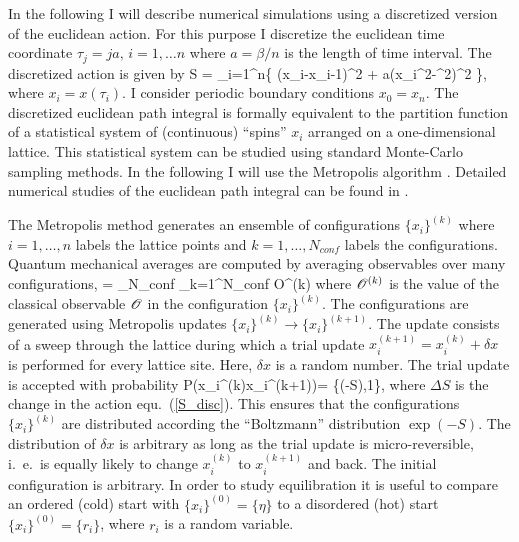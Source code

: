 In the following I will describe numerical simulations using a discretized 
version of the euclidean action. For this purpose I discretize the euclidean 
time coordinate $\tau_j=ja,\,i=1,\ldots n$ where $a=\beta/n$ is the length 
of time interval. The discretized action is given by
\be
\label{S_disc}
 S = \sum_{i=1}^{n}\left\{  (x_i-x_{i-1})^2
  + a(x_i^2-\eta^2)^2 \right\},
\ee
where $x_i=x(\tau_i)$. I consider periodic boundary conditions $x_0=x_n$. 
The discretized euclidean path integral is formally equivalent to the 
partition function of a statistical system of (continuous) ``spins'' 
$x_i$ arranged on a one-dimensional lattice. This statistical system 
can be studied using standard Monte-Carlo sampling methods. In the following 
I will use the Metropolis algorithm \cite{Metropolis:1953am}. Detailed
numerical studies of the euclidean path integral can be found in 
\cite{Creutz:1980gp,Shuryak:1984xr,Shuryak:1987tr,Schafer:2004xa}.

 The Metropolis method generates an ensemble of configurations
$\{x_i\}^{(k)}$ where $i=1,\ldots, n$ labels the lattice points and $k=
1,\ldots,N_{conf}$ labels the configurations. Quantum mechanical averages 
are computed by averaging observables over many configurations, 
\be 
{} \rangle = \lim_{N_{conf}\to\infty}
 \sum_{k=1}^{N_{conf}}
 {\cal O}^{(k)}
\ee
where ${\cal O}^{(k)}$ is the value of the classical observable
${\cal O}$ in the configuration $\{x_i\}^{(k)}$. The configurations 
are generated using Metropolis updates $\{x_i\}^{(k)}\to \{x_i\}^{(k+1)}$. 
The update consists of a sweep through the lattice during which a trial 
update $x_i^{(k+1)}= x_i^{(k)} +\delta x$ is performed for every lattice 
site. Here, $\delta x$ is a random number. The trial update is accepted 
with probability
\be
 P\left(x_i^{(k)}\to x_i^{(k+1)}\right)=
   \min\left\{\exp(-\Delta S),1\right\},
\ee 
where $\Delta S$ is the change in the action equ.~(\ref{S_disc}). 
This ensures that the configurations $\{x_i\}^{(k)}$ are distributed 
according the ``Boltzmann'' distribution $\exp(-S)$. The distribution 
of $\delta x$ is arbitrary as long as the trial update is micro-reversible, 
i.~e.~is equally likely to change $x_i^{(k)}$ to $x_i^{(k+1)}$ and back. 
The initial configuration is arbitrary. In order to study equilibration 
it is useful to compare an ordered (cold) start with $\{x_i\}^{(0)}=
\{\eta\}$ to a disordered (hot) start $\{x_i\}^{(0)}=\{r_i\}$, where 
$r_i$ is a random variable. 

